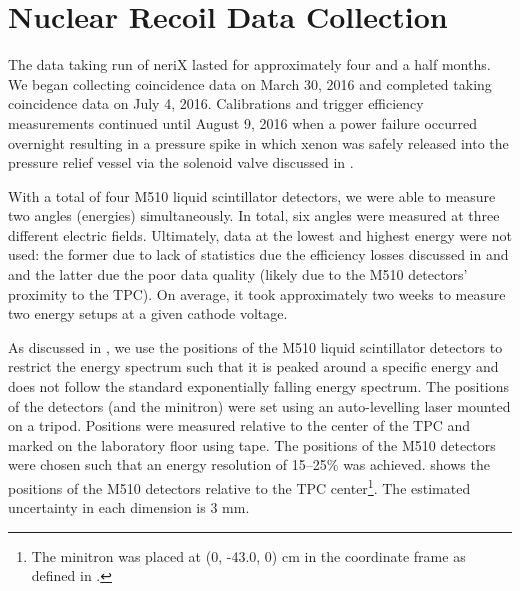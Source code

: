 \section{Nuclear Recoil Data Collection}

The data taking run of neriX lasted for approximately four and a half months.  We began collecting coincidence data on March 30, 2016 and completed taking coincidence data on July 4, 2016.  Calibrations and trigger efficiency measurements continued until August 9, 2016 when a power failure occurred overnight resulting in a pressure spike in which xenon was safely released into the pressure relief vessel via the solenoid valve discussed in .

With a total of four M510 liquid scintillator detectors, we were able to measure two angles (energies) simultaneously.  In total, six angles were measured at three different electric fields.  Ultimately, data at the lowest and highest energy were not used: the former due to lack of statistics due the efficiency losses discussed in  and  and the latter due the poor data quality (likely due to the M510 detectors' proximity to the TPC).  On average, it took approximately two weeks to measure two energy setups at a given cathode voltage.

As discussed in , we use the positions of the M510 liquid scintillator detectors to restrict the energy spectrum such that it is peaked around a specific energy and does not follow the standard exponentially falling energy spectrum.  The positions of the detectors (and the minitron) were set using an auto-levelling laser mounted on a tripod.  Positions were measured relative to the center of the TPC and marked on the laboratory floor using tape.  The positions of the M510 detectors were chosen such that an energy resolution of 15--25\% was achieved.   shows the positions of the M510 detectors relative to the TPC center\footnote{The minitron was placed at (0, -43.0, 0) cm in the coordinate frame as defined in .}.  The estimated uncertainty in each dimension is 3 mm.


